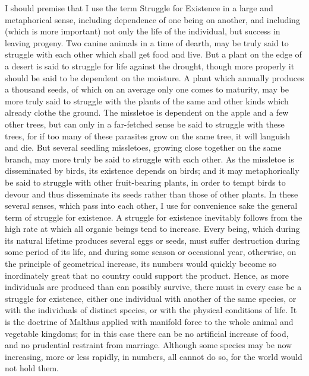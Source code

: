 I should premise that I use the term Struggle for Existence in a large and metaphorical sense, including dependence of one being on another, and including (which is more important) not only the life of the individual, but success in leaving progeny. Two canine animals in a time of dearth, may be truly said to struggle with each other which shall get food and live. But a plant on the edge of a desert is said to struggle for life against the drought, though more properly it should be said to be dependent on the moisture. A plant which annually produces a thousand seeds, of which on an average only one comes to maturity, may be more truly said to struggle with the plants of the same and other kinds which already clothe the ground. The missletoe is dependent on the apple and a few other trees, but can only in a far-fetched sense be said to struggle with these trees, for if too many of these parasites grow on the same tree, it will languish and die. But several seedling missletoes, growing close together on the same branch, may more truly be said to struggle with each other. As the missletoe is disseminated by birds, its existence depends on birds; and it may metaphorically be said to struggle with other fruit-bearing plants, in order to tempt birds to devour and thus disseminate its seeds rather than those of other plants. In these several senses, which pass into each other, I use for convenience sake the general term of struggle for existence.
A struggle for existence inevitably follows from the high rate at which all organic beings tend to increase. Every being, which during its natural lifetime produces several eggs or seeds, must suffer destruction during some period of its life, and during some season or occasional year, otherwise, on the principle of geometrical increase, its numbers would quickly become so inordinately great that no country could support the product. Hence, as more individuals are produced than can possibly survive, there must in every case be a struggle for existence, either one individual with another of the same species, or with the individuals of distinct species, or with the physical conditions of life. It is the doctrine of Malthus applied with manifold force to the whole animal and vegetable kingdoms; for in this case there can be no artificial increase of food, and no prudential restraint from marriage. Although some species may be now increasing, more or less rapidly, in numbers, all cannot do so, for the world would not hold them.
